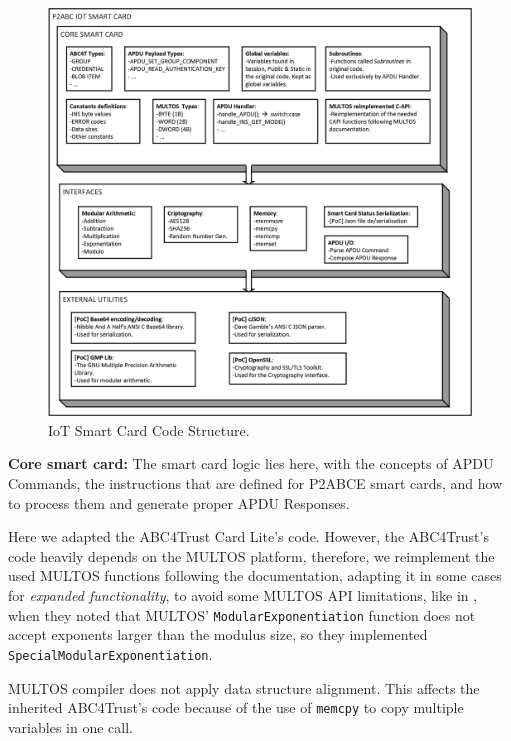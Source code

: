 \begin{figure}[bth]
	\begin{center}
		\includegraphics[width=\linewidth]{gfx/IoTCScomponents-bw}
	\end{center}
	\caption{IoT Smart Card Code Structure.}
	\label{fig:IoTCScomponents-bw}
\end{figure}


\hfil

\textbf{Core smart card:} The smart card logic lies here, with the concepts of APDU Commands, the instructions that are defined for P2ABCE smart cards, and how to process them and generate proper APDU Responses.

Here we adapted the ABC4Trust Card Lite's code. However, the ABC4Trust's code heavily depends on the MULTOS platform, therefore, we reimplement the used MULTOS functions following the documentation, adapting it in some cases for \textit{expanded functionality}, to avoid some MULTOS API limitations, like in \cite{vullers2013efficient}, when they noted that MULTOS' \texttt{ModularExponentiation}  function does not accept exponents larger than the modulus size, so they implemented \texttt{SpecialModularExponentiation}.

MULTOS compiler does not apply data structure alignment. This affects the inherited ABC4Trust's code because of the use of \texttt{memcpy} to copy multiple variables in one call.%

